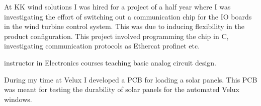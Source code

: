        
\divider

At KK wind solutions I was hired for a project of a half year where I was investigating the effort of switching out a communication chip for the IO boards in the wind turbine control system.
 This was due to inducing flexibility in the product configuration.
 This project involved programming the chip in C, investigating communication protocols as Ethercat profinet etc.

  
\divider

instructor in Electronics courses teaching basic analog circuit design.


\divider

During my time at Velux I developed a PCB for loading a solar panels.
 This PCB was meant for testing the durability of solar panels for the automated Velux windows.

\divider
